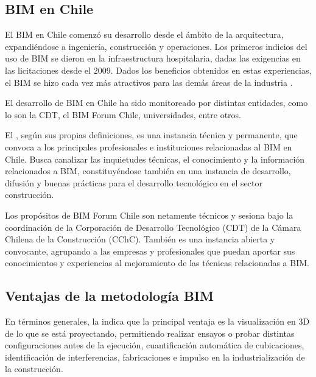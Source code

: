 
\subsection{BIM en Chile}

El BIM en Chile comenzó su desarrollo desde el ámbito de la arquitectura, expandiéndose a ingeniería, construcción y operaciones. Los primeros indicios del uso de BIM se dieron en la infraestructura hospitalaria, dadas las exigencias en las licitaciones desde el 2009. Dados los beneficios obtenidos en estas experiencias, el BIM se hizo cada vez más atractivos para las demás áreas de la industria \cite{trejo2018estudio}.

El desarrollo de BIM en Chile ha sido monitoreado por distintas entidades, como lo son la CDT, el BIM Forum Chile, universidades, entre otros.

El , según sus propias definiciones, es una instancia técnica y permanente, que convoca a los principales profesionales e instituciones relacionadas al BIM en Chile. Busca canalizar las inquietudes técnicas, el conocimiento y la información relacionados a BIM, constituyéndose también en una instancia de desarrollo, difusión y buenas prácticas para el desarrollo tecnológico en el sector construcción.

Los propósitos de BIM Forum Chile son netamente técnicos y sesiona bajo la coordinación de la Corporación de Desarrollo Tecnológico (CDT) de la Cámara Chilena de la Construcción (CChC). También es una instancia abierta y convocante, agrupando a las empresas y profesionales que puedan aportar sus conocimientos y experiencias al mejoramiento de las técnicas relacionadas a BIM.

\subsection{Ventajas de la metodología BIM}

En términos generales, la  indica que la principal ventaja es la visualización en 3D de lo que se está proyectando, permitiendo realizar ensayos o probar distintas configuraciones antes de la ejecución, cuantificación automática de cubicaciones, identificación de interferencias, fabricaciones e impulso en la industrialización de la construcción.

